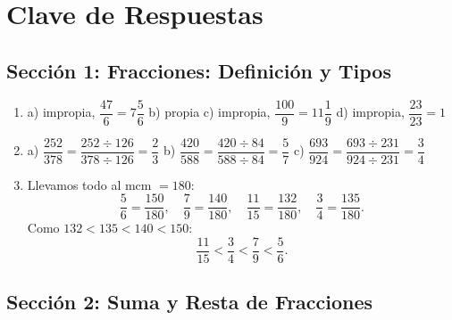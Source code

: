 \documentclass[12pt, letterpaper]{article}
\begin{document}
\newpage

\ifmwclaves
  \section{Clave de Respuestas}

  \subsection*{Sección 1: Fracciones: Definición y Tipos}

  \begin{enumerate}[leftmargin=*, label=\textbf{\arabic*.}]
    \item a) impropia, $\dfrac{47}{6} = 7\dfrac{5}{6}$ \quad b) propia \quad c) impropia, $\dfrac{100}{9} = 11\dfrac{1}{9}$ \quad d) impropia, $\dfrac{23}{23} = 1$

    \item
          a) $\dfrac{252}{378} = \dfrac{252 \div 126}{378 \div 126} = \dfrac{2}{3}$ \quad
          b) $\dfrac{420}{588} = \dfrac{420 \div 84}{588 \div 84} = \dfrac{5}{7}$ \quad
          c) $\dfrac{693}{924} = \dfrac{693 \div 231}{924 \div 231} = \dfrac{3}{4}$

    \item Llevamos todo al mcm $= 180$:
          $$\frac{5}{6} = \frac{150}{180}, \quad \frac{7}{9} = \frac{140}{180}, \quad \frac{11}{15} = \frac{132}{180}, \quad \frac{3}{4} = \frac{135}{180}.$$
          Como $132 < 135 < 140 < 150$:
          $$\frac{11}{15} < \frac{3}{4} < \frac{7}{9} < \frac{5}{6}.$$
  \end{enumerate}

  \newpage

  \subsection*{Sección 2: Suma y Resta de Fracciones}
\end{document}
